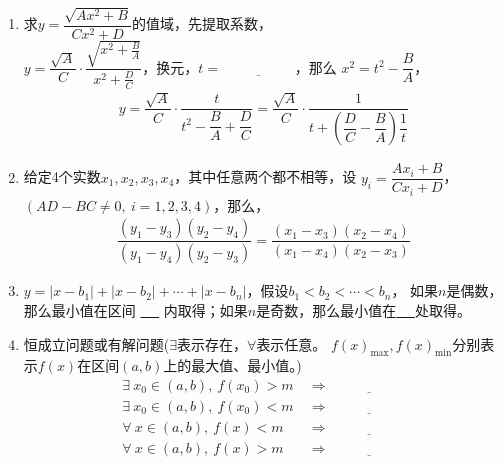 \documentclass{article}
\newif\ifte
\begin{document}
\begin{multicols}{2}
\begin{enumerate}[leftmargin=20pt]
\item 求$ y=\dfrac{\sqrt{Ax^2+B}}{Cx^2+D} $的值域，先提取系数，\\
$ y=\dfrac{\sqrt{A}}{C}\cdot\dfrac{\sqrt{x^2+\frac{B}{A}}}{
x^2+\frac{D}{C}} $，换元，$ t=\underline{\ \ifte 
\sqrt{x^2+\dfrac{B}{A}} \else \hspace{2cm} \fi\ } $，那么
$ x^2=t^2-\dfrac{B}{A} $，
\begin{gather*}
    y=\dfrac{\sqrt{A}}{C}\cdot \dfrac{t}{t^2-\dfrac{B}{A}+\dfrac{D}{C}}=
    \dfrac{\sqrt{A}}{C}\cdot \dfrac{1}{t+\left(\dfrac{D}{C}-\dfrac{B}{A}
    \right) \dfrac{1}{t}}
\end{gather*}

\item 给定4个实数$ x_1,x_2,x_3,x_4 $，其中任意两个都不相等，设
$ y_i=\dfrac{Ax_i+B}{Cx_i+D} $，$ (AD-BC\neq 0,\ i=1,2,3,4) $，那么，
\begin{gather*}
    \dfrac{(y_1-y_3)(y_2-y_4)}{(y_1-y_4)(y_2-y_3)}=
    \dfrac{(x_1-x_3)(x_2-x_4)}{(x_1-x_4)(x_2-x_3)}
\end{gather*}

\item $ y=|x-b_1|+|x-b_2|+\cdots+|x-b_n| $，假设$ b_1<b_2<\cdots<b_n $，
如果$ n $是偶数，那么最小值在区间
\underline{\ \ifte $ [b_{\frac{n}{2}},
b_{\frac{n}{2}+1}] $\else \hspace{2cm} \fi\ }
内取得；如果$ n $是奇数，那么最小值在\underline{\ 
\ifte $ x=b_{\frac{n+1}{2}} $\else \hspace{2cm} \fi\ }处取得。

\item 恒成立问题或有解问题($ \exists $表示存在，$ \forall $表示任意。
$ f(x)_{\max},f(x)_{\min} $分别表示$ f(x) $在区间$ (a,b) $上的最大值、最小值。)
\begin{align*}
    \exists\ x_0\in(a,b),\ f(x_0)>m &\ \Rightarrow \ 
    \underline{\ \ifte f(x)_{\max} >m\else \hspace{2cm} \fi\ }\\
    \exists\ x_0\in(a,b),\ f(x_0)<m &\ \Rightarrow \ 
    \underline{\ \ifte f(x)_{\min} <m\else \hspace{2cm} \fi\ }\\
    \forall\ x\in(a,b),\ f(x)<m &\ \Rightarrow \ 
    \underline{\ \ifte f(x)_{\max} <m\else \hspace{2cm} \fi\ }\\
    \forall\ x\in(a,b),\ f(x)>m &\ \Rightarrow \ 
    \underline{\ \ifte f(x)_{\min} >m\else \hspace{2cm} \fi\ }
\end{align*}


\end{enumerate}
\end{multicols}
\end{document}
